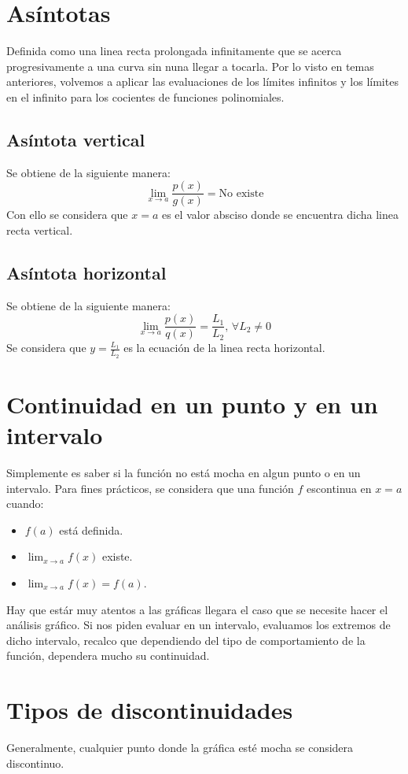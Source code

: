 \documentclass[letterpaper, 12pt]{article}
\begin{document}
    \section{Asíntotas}
    Definida como una linea recta prolongada infinitamente que se acerca progresivamente a una curva sin nuna llegar a tocarla. Por lo visto en temas anteriores, volvemos a aplicar
    las evaluaciones de los límites infinitos y los límites en el infinito para los cocientes de funciones polinomiales.
    \subsection*{Asíntota vertical}
    Se obtiene de la siguiente manera:
    \[\lim_{x\rightarrow a} \frac{p(x)}{g(x)}=\text{No existe}\]
    Con ello se considera que \(x=a\) es el valor absciso donde se encuentra dicha linea recta vertical.
    \subsection*{Asíntota horizontal}
    Se obtiene de la siguiente manera:
    \[\lim_{x \rightarrow a}\frac{p(x)}{q(x)}=\frac{L_1}{L_2},\,\forall L_2\neq 0\]
    Se considera que \(y=\frac{L_1}{L_2}\) es la ecuación de la linea recta horizontal.
    \section{Continuidad en un punto y en un intervalo}
    Simplemente es saber si la función no está mocha en algun punto o en un intervalo. Para fines prácticos, se considera que una función \(f\) escontinua en \(x=a\) cuando:
    \begin{itemize}
        \item \(f(a)\) está definida.
        \item \(\lim_{x\rightarrow a}f(x)\) existe.
        \item \(\lim_{x\rightarrow a}f(x)=f(a)\).
    \end{itemize}
    Hay que estár muy atentos a las gráficas llegara el caso que se necesite hacer el análisis gráfico. Si nos piden evaluar en un intervalo, evaluamos los extremos de dicho intervalo, recalco que
    dependiendo del tipo de comportamiento de la función, dependera mucho su continuidad.
    \section{Tipos de discontinuidades}
    Generalmente, cualquier punto donde la gráfica esté mocha se considera discontinuo.
\end{document}
